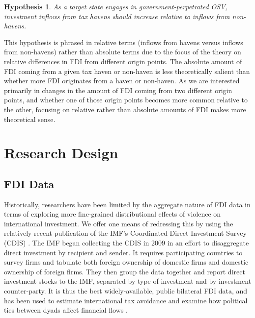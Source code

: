 \documentclass[11pt, titlepage]{article} %
\newtheorem{hyp}{Hypothesis}
\begin{document}
\begin{hyp}
    As a target state engages in government-perpetrated OSV, investment inflows from tax havens should increase relative to inflows from non-havens.
\end{hyp}

This hypothesis is phrased in relative terms (inflows from havens versus inflows from non-havens) rather than absolute terms due to the focus of the theory on relative differences in FDI from different origin points. The absolute amount of FDI coming from a given tax haven or non-haven is less theoretically salient than whether more FDI originates from a haven or non-haven. As we are interested primarily in changes in the amount of FDI coming from two different origin points, and whether one of those origin points becomes more common relative to the other, focusing on relative rather than absolute amounts of FDI makes more theoretical sense. 


\section*{Research Design}

\subsection*{FDI Data}

Historically, researchers have been limited by the aggregate nature of FDI data in terms of exploring more fine-grained distributional effects of violence on international investment. We offer one means of redressing this by using the relatively recent publication of the IMF's Coordinated Direct Investment Survey (CDIS) \parencite{internationalmonetaryfundCoordinatedDirectInvestment2015}. The IMF began collecting the CDIS in 2009 in an effort to disaggregate direct investment by recipient and sender. It requires participating countries to survey firms and tabulate both foreign ownership of domestic firms and domestic ownership of foreign firms. They then group the data together and report direct investment stocks to the IMF, separated by type of investment and by investment counter-party. It is thus the best widely-available, public bilateral FDI data, and has been used to estimate international tax avoidance \parencite{janskyPanamaReallyYour2021} and examine how political ties between dyads affect financial flows \parencite{beazerConditionalNaturePolitical2018}. 
\end{document}
